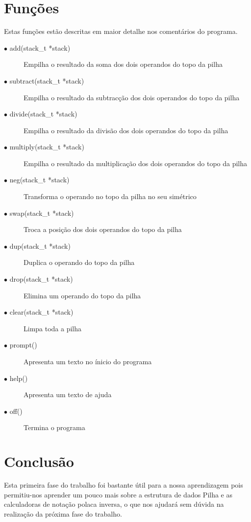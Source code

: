 \documentclass[titlepage,12pt]{article}   %
\begin{document}
\section{Funções}

Estas funções estão descritas em maior detalhe nos comentários do programa.

\begin{description}
  \item[$\bullet$ add(stack\_t *stack)] Empilha o resultado da soma dos dois operandos do topo da pilha
  \item[$\bullet$ subtract(stack\_t *stack)] Empilha o resultado da subtracção dos dois operandos do topo da pilha
  \item[$\bullet$ divide(stack\_t *stack)] Empilha o resultado da divisão dos dois operandos do topo da pilha
  \item[$\bullet$ multiply(stack\_t *stack)] Empilha o resultado da multiplicação dos dois operandos do topo da pilha
  \item[$\bullet$ neg(stack\_t *stack)] Transforma o operando no topo da pilha no seu simétrico
  \item[$\bullet$ swap(stack\_t *stack)] Troca a posição dos dois operandos do topo da pilha
  \item[$\bullet$ dup(stack\_t *stack)] Duplica o operando do topo da pilha
  \item[$\bullet$ drop(stack\_t *stack)] Elimina um operando do topo da pilha
  \item[$\bullet$ clear(stack\_t *stack)] Limpa toda a pilha 
  \item[$\bullet$ prompt()] Apresenta um texto no ínicio do programa
  \item[$\bullet$ help()] Apresenta um texto de ajuda 
  \item[$\bullet$ off()] Termina o programa

\end{description}

\section{Conclusão}

Esta primeira fase do trabalho foi bastante útil para a nossa aprendizagem pois permitiu-nos aprender um pouco mais sobre a estrutura de dados Pilha e as calculadoras de notação polaca inversa, o que nos ajudará sem dúvida na realização da próxima fase do trabalho.
\end{document}
